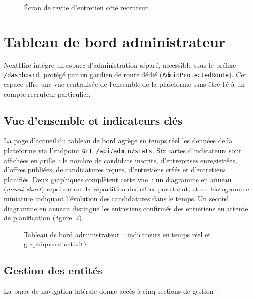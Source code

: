 \begin{figure}[H]
  \centering
  \caption{Écran de revue d'entretien côté recruteur.}
  \label{fig:interview-review}
\end{figure}

\section{Tableau de bord administrateur}

NextHire intègre un espace d'administration séparé, accessible sous le préfixe
\texttt{/dashboard}, protégé par un gardien de route dédié (\texttt{AdminProtectedRoute}).
Cet espace offre une vue centralisée de l'ensemble de la plateforme sans être lié à un
compte recruteur particulier.

\subsection{Vue d'ensemble et indicateurs clés}

La page d'accueil du tableau de bord agrège en temps réel les données de la plateforme via
l'endpoint \texttt{GET /api/admin/stats}. Six cartes d'indicateurs sont affichées en grille~:
le nombre de candidats inscrits, d'entreprises enregistrées, d'offres publiées, de
candidatures reçues, d'entretiens créés et d'entretiens planifiés. Deux graphiques complètent
cette vue~: un diagramme en anneau (\textit{donut chart}) représentant la répartition des
offres par statut, et un histogramme miniature indiquant l'évolution des candidatures dans
le temps. Un second diagramme en anneau distingue les entretiens confirmés des entretiens
en attente de planification (figure~\ref{fig:admin-dashboard}).

\begin{figure}[H]
  \centering
  \caption{Tableau de bord administrateur~: indicateurs en temps réel et graphiques d'activité.}
  \label{fig:admin-dashboard}
\end{figure}

\subsection{Gestion des entités}

La barre de navigation latérale donne accès à cinq sections de gestion~:

